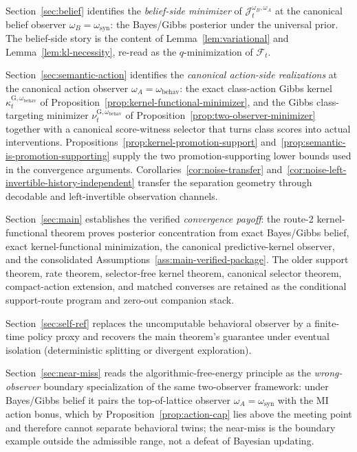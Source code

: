 \documentclass[11pt]{article}
\theoremstyle{definition}
\theoremstyle{remark}
\begin{document}
Section~\ref{sec:belief} identifies the \emph{belief-side minimizer} of $\mathcal J_t^{\omega_B,\omega_A}$ at the canonical belief observer $\omega_B=\omega_{\mathrm{syn}}$: the Bayes/Gibbs posterior under the universal prior. The belief-side story is the content of Lemma~\ref{lem:variational} and Lemma~\ref{lem:kl-necessity}, re-read as the $q$-minimization of $\mathcal F_t$.

Section~\ref{sec:semantic-action} identifies the \emph{canonical action-side realizations} at the canonical action observer $\omega_A=\omega_{\mathrm{behav}}$: the exact class-action Gibbs kernel $\kappa_t^{\mathrm G,\omega_{\mathrm{behav}}}$ of Proposition~\ref{prop:kernel-functional-minimizer}, and the Gibbs class-targeting minimizer $\nu_t^{\mathrm G,\omega_{\mathrm{behav}}}$ of Proposition~\ref{prop:two-observer-minimizer} together with a canonical score-witness selector that turns class scores into actual interventions. Propositions~\ref{prop:kernel-promotion-support} and~\ref{prop:semantic-is-promotion-supporting} supply the two promotion-supporting lower bounds used in the convergence arguments. Corollaries~\ref{cor:noise-transfer} and~\ref{cor:noise-left-invertible-history-independent} transfer the separation geometry through decodable and left-invertible observation channels.

Section~\ref{sec:main} establishes the verified \emph{convergence payoff}: the route-2 kernel-functional theorem proves posterior concentration from exact Bayes/Gibbs belief, exact kernel-functional minimization, the canonical predictive-kernel observer, and the consolidated Assumptions~\ref{ass:main-verified-package}. The older support theorem, rate theorem, selector-free kernel theorem, canonical selector theorem, compact-action extension, and matched converses are retained as the conditional support-route program and zero-out companion stack.

Section~\ref{sec:self-ref} replaces the uncomputable behavioral observer by a finite-time policy proxy and recovers the main theorem's guarantee under eventual isolation (deterministic splitting or divergent exploration).

Section~\ref{sec:near-miss} reads the algorithmic-free-energy principle as the \emph{wrong-observer} boundary specialization of the same two-observer framework: under Bayes/Gibbs belief it pairs the top-of-lattice observer $\omega_A=\omega_{\mathrm{syn}}$ with the MI action bonus, which by Proposition~\ref{prop:action-cap} lies above the meeting point and therefore cannot separate behavioral twins; the near-miss is the boundary example outside the admissible range, not a defeat of Bayesian updating.
\end{document}
